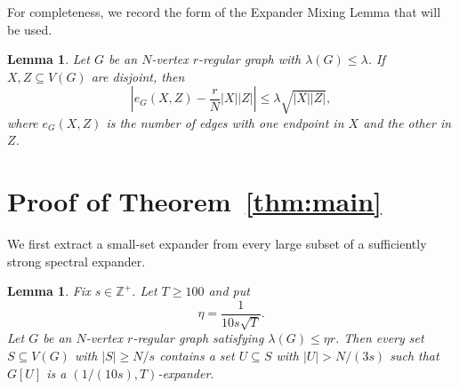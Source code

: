 \documentclass[11pt]{article}
\newtheorem{lemma}[theorem]{Lemma}
\theoremstyle{definition}
\begin{document}
For completeness, we record the form of the Expander Mixing Lemma that
will be used.

\begin{lemma}\label{lem:EML}
Let $G$ be an $N$-vertex $r$-regular graph with $\lambda(G)\le\lambda$.
If $X,Z\subseteq V(G)$ are disjoint, then
\[
\left|e_G(X,Z)-\frac{r}{N}|X||Z|\right|
   \le \lambda\sqrt{|X||Z|},
\]
where $e_G(X,Z)$ is the number of edges with one endpoint in $X$ and the
other in $Z$.
\end{lemma}



\section{Proof of Theorem~\ref{thm:main}}

We first extract a small-set expander from every large subset of a
sufficiently strong spectral expander.

\begin{lemma}\label{lem:robust}
Fix $s\in\mathbb{Z}^+$. Let $T\ge 100$ and put
\[
\eta=\frac{1}{10s\sqrt{T}}.
\]
Let $G$ be an
$N$-vertex $r$-regular graph satisfying
$\lambda(G)\le\eta r$. Then every set $S\subseteq V(G)$ with
$|S|\ge N/s$ contains a set $U\subseteq S$ with $|U|>N/(3s)$ such that
$G[U]$ is a $(1/(10s),T)$-expander.
\end{lemma}
\end{document}

